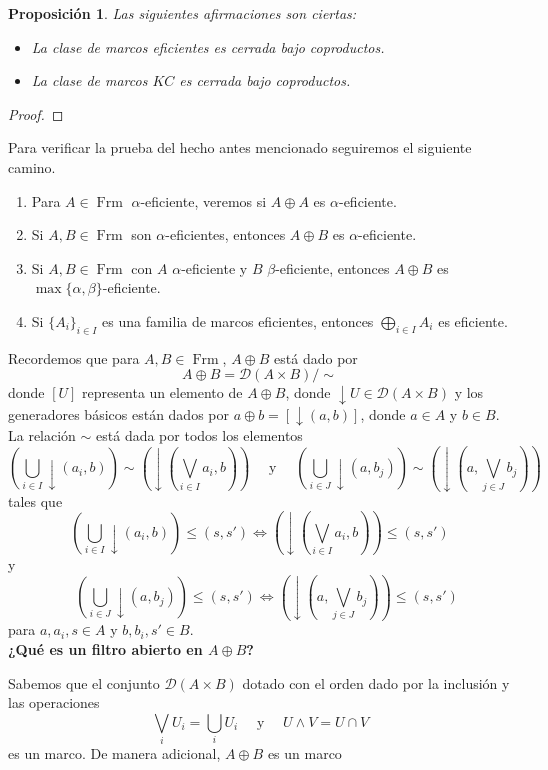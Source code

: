 \documentclass[11pt]{amsart}
\DeclareMathOperator{\Frm}{Frm}
\theoremstyle{plain}
\newtheorem{prop}[thm]{Proposición}
\theoremstyle{definition}
\begin{document}
\begin{prop}\label{coprod}
Las siguientes afirmaciones son ciertas:
\begin{itemize}
\item[(1)] La clase de marcos eficientes es cerrada bajo coproductos.
\item[(2)] La clase de marcos $KC$ es cerrada bajo coproductos. 
\end{itemize}	
\end{prop}

\begin{proof}

\end{proof}

Para verificar la prueba del hecho antes mencionado seguiremos el siguiente camino.
\begin{enumerate}
    \item Para $A\in \Frm$ $\alpha$-eficiente, veremos si $A\oplus A$ es $\alpha$-eficiente.
    \item Si $A, B\in \Frm$ son $\alpha$-eficientes, entonces $A\oplus B$ es $\alpha$-eficiente.
    \item Si $A, B\in \Frm$ con $A$ $\alpha$-eficiente y $B$ $\beta$-eficiente, entonces $A\oplus B$ es $\max\{\alpha, \beta\}$-eficiente.
    \item Si $\{A_i\}_{i\in I}$ es una familia de marcos eficientes, entonces $\bigoplus_{i\in I} A_i$ es eficiente.
\end{enumerate}

Recordemos que para $A, B\in \Frm$, $A\oplus B$ está dado por 
\[
A\oplus B=\mathcal{D}(A\times B)/\sim
\]
donde $[U]$ representa un elemento de $A\oplus B$, donde $\downarrow U\in \mathcal{D}(A\times B)$ y los generadores básicos
están dados por $a\oplus b=[\downarrow (a, b)]$, donde $a\in A$ y $b\in B$. La relación $\sim$ está dada por todos los elementos
\[
(\bigcup_{i\in I} \downarrow (a_i, b))\sim (\downarrow (\bigvee_{i\in I} a_i, b))\quad \mbox{ y }\quad (\bigcup_{i\in J} \downarrow (a, b_j))\sim (\downarrow (a, \bigvee_{j\in J} b_j))
\]
tales que 
\[
(\bigcup_{i\in I} \downarrow (a_i, b))\leq (s, s')\Leftrightarrow (\downarrow (\bigvee_{i\in I} a_i, b))\leq (s,s')
\]
y
\[
\quad (\bigcup_{i\in J} \downarrow (a, b_j))\leq (s, s')\Leftrightarrow (\downarrow (a, \bigvee_{j\in J} b_j))\leq (s, s')
\]
para $a, a_i, s\in A$ y $b, b_i, s'\in B$.\\

\textbf{¿Qué es un filtro abierto en $A\oplus B$?}

Sabemos que el conjunto $\mathcal{D}(A\times B)$ dotado con el orden dado por la inclusión y las operaciones
\[
\bigvee_i U_i=\bigcup_i U_i\quad \mbox{ y }\quad U\wedge V=U\cap V
\]
es un marco. De manera adicional, $A\oplus B$ es un marco\\
\end{document}
